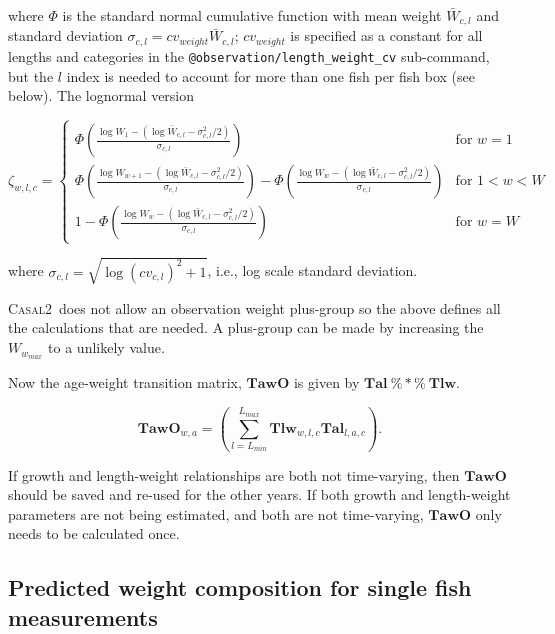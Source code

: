 \documentclass[a4paper,11pt,twoside,pdftex,draft]{article}
\newcommand{\CNAME}{\textsc{Casal2}}
\begin{document}
where $\Phi$ is the standard normal cumulative function with mean weight $\bar W_{c,l}$ and standard deviation $\sigma_{c,l}= cv_{weight} \bar W_{c,l}$; $cv_{weight}$ is specified as a constant for all lengths and categories  in the  \texttt{@observation/length\_weight\_cv} sub-command, but the $l$ index is needed to account for more than one fish per fish box (see below). The lognormal version

\begin{equation}
\zeta_{w,l,c} =
\begin{cases}
\Phi\left( \frac{\log W_{1} - \left( \log\bar W_{c,l}  - \sigma_{c,l}^2/2 \right)}{\sigma_{c,l}} \right) & \text{for } w = 1 \\

\Phi\left( \frac{\log W_{w+1} - \left( \log\bar W_{c,l}  - \sigma_{c,l}^2/2 \right)}{\sigma_{c,l}} \right)   - \Phi\left( \frac{\log W_{w} - \left( \log\bar W_{c,l}  - \sigma_{c,l}^2/2 \right)}{\sigma_{c,l}} \right) & \text{for } 1 < w < W \\

1 - \Phi\left( \frac{\log W_{w} - \left( \log\bar W_{c,l}  - \sigma_{c,l}^2/2 \right)}{\sigma_{c,l}} \right) & \text{for } w = W
\end{cases}
\end{equation}

where $\sigma_{c,l} = \sqrt{\log(cv_{c,l})^2 + 1}$, i.e., log scale standard deviation.

\CNAME~does not allow an observation weight plus-group so the above defines all the calculations that are needed. A plus-group can be made by increasing the $W_{w_{max}}$ to a unlikely value.

Now the age-weight transition matrix, $\mathbf{TawO}$ is given by $\mathbf{Tal} \ \%*\%\ \mathbf{Tlw} $.

\begin{equation}
\mathbf{TawO}_{w,a} = \left( \sum_{l=L_{min}}^{L_{max}}  \mathbf{Tlw}_{w,l,c}  \mathbf{Tal}_{l,a,c}\right).
\end{equation}

If growth and length-weight relationships are both not time-varying, then $\mathbf{TawO}$ should be saved and re-used for the other years. If both growth and length-weight parameters are not being estimated, and both are not time-varying, $\mathbf{TawO}$ only needs to be calculated once.


\subsection{Predicted weight composition for single fish measurements}
\end{document}
